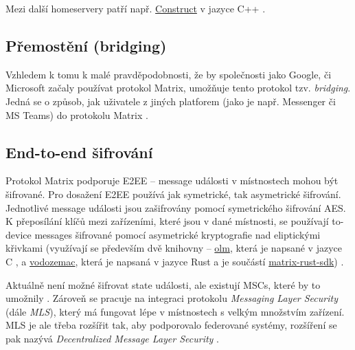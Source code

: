 Mezi další homeservery patří např.
\href{https://github.com/matrix-construct/construct}{Construct} v jazyce C++
\cite{GitHub-Construct}.

\subsection{Přemostění (bridging)}

Vzhledem k tomu k malé pravděpodobnosti, že by společnosti jako Google, či
Microsoft začaly používat protokol Matrix, umožňuje tento protokol tzv.
\textit{bridging}. Jedná se o způsob, jak  uživatele z jiných
platforem (jako je např. Messenger či MS Teams) do protokolu Matrix
\cite{MatrixORG-Bridges}.

\subsection{End-to-end šifrování}\label{matrix-encryption}

Protokol Matrix podporuje E2EE -- message události v místnostech mohou být
šifrované. Pro dosažení E2EE používá jak symetrické, tak asymetrické šifrování.
Jednotlivé message události jsou zašifrovány pomocí symetrického šifrování AES.
K přeposílání klíčů mezi zařízeními, které jsou v dané místnosti, se používají
to-device messages šifrované pomocí asymetrické kryptografie nad
eliptickými křivkami (využívají se především dvě knihovny --
\href{https://gitlab.matrix.org/matrix-org/olm}{olm}, která je napsané v jazyce
C \cite{GitLab-Olm}, a
\href{https://github.com/matrix-org/vodozemac}{vodozemac}, která je napsaná v
jazyce Rust a je součástí
\href{https://github.com/matrix-org/matrix-rust-sdk}{matrix-rust-sdk})
\cite{GitHub-MatrixRustSDK}.

Aktuálně není možné šifrovat state události, ale existují MSCs, které by to
umožnily \cite{GitHub-MSC3414}. Zároveň se pracuje na integraci protokolu
\textit{Messaging Layer Security} (dále \textit{MLS}), který má fungovat lépe v
místnostech s velkým množstvím zařízení. MLS je ale třeba rozšířit tak, aby
podporovalo federované systémy, rozšíření se pak nazývá \textit{Decentralized
	Message Layer Security} \cite{AreWeMLSYet}.
